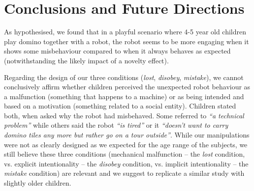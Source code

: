 \documentclass{sig-alternate}
\begin{document}
\section{Conclusions and Future Directions}


As hypothesised, we found that in a playful scenario where 4-5 year old children
play domino together with a robot, the robot seems to be more engaging when it
shows some misbehaviour compared to when it always behaves as expected
(notwithstanding the likely impact of a novelty effect).

Regarding the design of our three conditions (\emph{lost},
\emph{disobey}, \emph{mistake}), we cannot conclusively affirm whether children perceived the
unexpected robot behaviour as a malfunction (something that happens to a
machine) or as being intended and based on a motivation (something related to a
social entity). Children stated both, when asked why the robot had misbehaved.
Some referred to \textit{``a technical problem''} while others said the robot
\textit{``is tired''} or it \textit{``doesn't want to carry domino tiles any
more but rather go on a tour outside''}. While our manipulations were not as
clearly designed as we expected for the age range of the subjects, we still
believe these three conditions (mechanical malfunction -- the \emph{lost}
condition, vs. explicit intentionality -- the \emph{disobey} condition, vs.
implicit intentionality -- the \emph{mistake} condition) are relevant and we
suggest to replicate a similar study with slightly older children.


\end{document}
